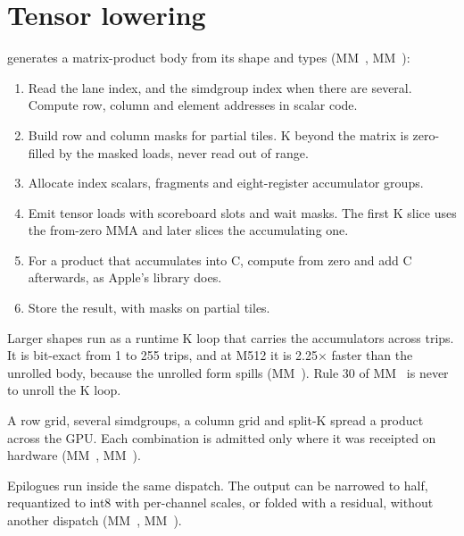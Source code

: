 \section{Tensor lowering}\label{ch:tensor-lowering}

 generates a matrix-product body from its shape and types (MM~, MM~):

\begin{enumerate}
\def\labelenumi{\arabic{enumi}.}
\item Read the lane index, and the simdgroup index when there are several. Compute row, column and element addresses
  in scalar code.
\item Build row and column masks for partial tiles. K beyond the matrix is zero-filled by the masked loads, never read
  out of range.
\item Allocate index scalars, fragments and eight-register accumulator groups.
\item Emit tensor loads with scoreboard slots and wait masks. The first K slice uses the from-zero MMA and later slices
  the accumulating one.
\item For a product that accumulates into C, compute from zero and add C afterwards, as Apple's library does.
\item Store the result, with masks on partial tiles.
\end{enumerate}

Larger shapes run as a runtime K loop that carries the accumulators across trips. It is bit-exact from 1 to 255
trips, and at M512 it is 2.25× faster than the unrolled body, because the unrolled form spills (MM~). Rule 30
of MM~ is never to unroll the K loop.

A row grid, several simdgroups, a column grid and split-K spread a product across the GPU. Each combination is
admitted only where it was receipted on hardware (MM~, MM~).

Epilogues run inside the same dispatch. The output can be narrowed to half, requantized to int8 with
per-channel scales, or folded with a residual, without another dispatch (MM~, MM~).
